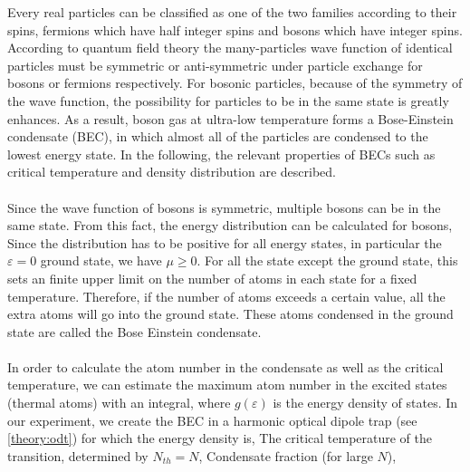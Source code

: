 Every real particles can be classified as one of the two families according to their spins, fermions which have half integer spins and bosons which have integer spins. According to quantum field theory\cite{spin-statistics1,spin-statistics2} the many-particles wave function of identical particles must be symmetric or anti-symmetric under particle exchange for bosons or fermions respectively. For bosonic particles, because of the symmetry of the wave function, the possibility for particles to be in the same state is greatly enhances. As a result, boson gas at ultra-low temperature forms a Bose-Einstein condensate (BEC), in which almost all of the particles are condensed to the lowest energy state. In the following, the relevant properties of BECs such as critical temperature and density distribution are described.\\
\\
Since the wave function of bosons is symmetric, multiple bosons can be in the same state. From this fact, the energy distribution can be calculated for bosons,
Since the distribution has to be positive for all energy states, in particular the $\varepsilon=0$ ground state, we have $\mu\geqslant0$. For all the state except the ground state, this sets an finite upper limit on the number of atoms in each state for a fixed temperature. Therefore, if the number of atoms exceeds a certain value, all the extra atoms will go into the ground state. These atoms condensed in the ground state are called the Bose Einstein condensate.\\
\\
In order to calculate the atom number in the condensate as well as the critical temperature, we can estimate the maximum atom number in the excited states (thermal atoms) with an integral,
where $g(\varepsilon)$ is the energy density of states. In our experiment, we create the BEC in a harmonic optical dipole trap (see \ref{theory:odt}) for which the energy density is,
The critical temperature of the transition, determined by $N_{th}=N$,
Condensate fraction (for large $N$),

